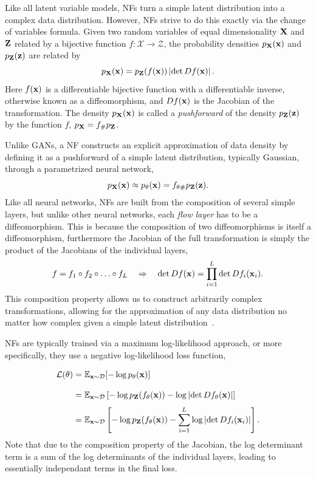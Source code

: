 Like all latent variable models, NFs turn a simple latent distribution into a complex data distribution.
However, NFs strive to do this exactly via the change of variables formula.
Given two random variables of equal dimensionality $\mathbf{X}$ and $\mathbf{Z}$ related by a bijective function $f: \mathcal{X} \rightarrow \mathcal{Z}$, the probability densities $p_{\mathbf{X}}(\mathbf{x})$ and $p_{\mathbf{Z}}(\mathbf{z})$ are related by
\begin{equation}
    \label{eq:change_of_variables}
    p_{\mathbf{X}}(\mathbf{x}) = p_{\mathbf{Z}}(f(\mathbf{x})) \left|\det D f(\mathbf{x}) \right|.
\end{equation}
Here $f(\mathbf{x})$ is a differentiable bijective function with a differentiable inverse, otherwise known as a diffeomorphism, and $D f(\mathbf{x})$ is the Jacobian of the transformation.
The density $p_{\mathbf{X}}(\mathbf{x})$ is called a \textit{pushforward} of the density $p_{\mathbf{Z}}(\mathbf{z})$ by the function $f$, $p_{\mathbf{X}} = f_\# p_{\mathbf{Z}}$.

Unlike GANs, a NF constructs an explicit approximation of data density by defining it as a pushforward of a simple latent distribution, typically Gaussian, through a parametrized neural network,
\begin{equation}
    p_{\mathbf{X}}(\mathbf{x}) \approx p_{\theta}(\mathbf{x}) = f_{\theta \#} p_{\mathbf{Z}}(\mathbf{z}).
\end{equation}
Like all neural networks, NFs are built from the composition of several simple layers, but unlike other neural networks, each \textit{flow layer} has to be a diffeomorphism.
This is because the composition of two diffeomorphisms is itself a diffeomorphism, furthermore the Jacobian of the full transformation is simply the product of the Jacobians of the individual layers,
\begin{equation}
    f = f_1 \circ f_2 \circ \ldots \circ f_L \quad \Rightarrow \quad \det D f(\mathbf{x}) = \prod_{i=1}^L \det D f_i(\mathbf{x}_i).
\end{equation}
This composition property allows us to construct arbitrarily complex transformations, allowing for the approximation of any data distribution no matter how complex given a simple latent distribution~\cite{bogachev2005triangular}.

NFs are typically trained via a maximum log-likelihood approach, or more specifically, they use a negative log-likelihood loss function,
\begin{equation}
    \label{eq:nf_loss}
    \begin{aligned}
        \mathcal{L}(\theta)
        \frach &= \mathbb{E}_{\x \sim \mathcal{D}}[-\log p_{\theta}(\x)] \\
        \frach &= \mathbb{E}_{\x \sim \mathcal{D}}\left[-\log p_{\Z}(f_{\theta}(\x)) - \log \left|\det D f_{\theta}(\x) \right|\right] \\
        \frach &= \mathbb{E}_{\x \sim \mathcal{D}}\left[-\log p_{\Z}(f_{\theta}(\x)) - \sum_{i=1}^L \log \left|\det D f_i(\x_i) \right|\right].
    \end{aligned}
\end{equation}
Note that due to the composition property of the Jacobian, the log determinant term is a sum of the log determinants of the individual layers, leading to essentially independant terms in the final loss.


